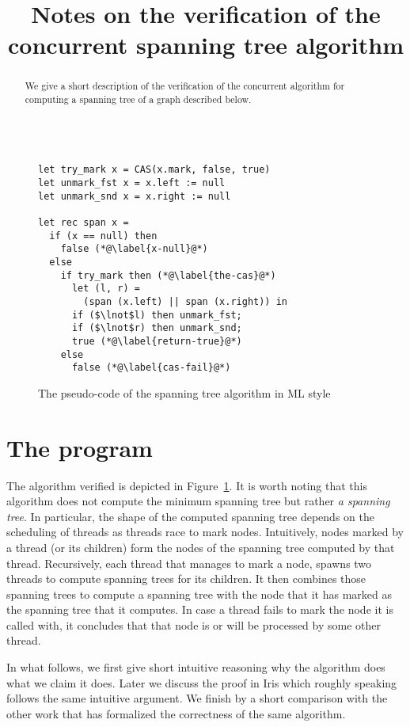 \documentclass[nocopyrightspace]{sigplanconf}
\title{Notes on the verification of the concurrent spanning tree algorithm}
\begin{document}
\maketitle

\begin{abstract}
We give a short description of the verification of the concurrent algorithm for computing
a spanning tree of a graph described below.
\end{abstract}

\begin{figure}
\begin{lstlisting}[mathescape=true, language=MyML]

let try_mark x = CAS(x.mark, false, true)
let unmark_fst x = x.left := null
let unmark_snd x = x.right := null

let rec span x =
  if (x == null) then
    false (*@\label{x-null}@*)
  else
    if try_mark then (*@\label{the-cas}@*)
      let (l, r) =
        (span (x.left) || span (x.right)) in
      if ($\lnot$l) then unmark_fst;
      if ($\lnot$r) then unmark_snd;
      true (*@\label{return-true}@*)
    else
      false (*@\label{cas-fail}@*)
\end{lstlisting}
\caption{The pseudo-code of the spanning tree algorithm in ML style}
\label{fig:code}
\end{figure}

\section{The program}
The algorithm verified is depicted in Figure~\ref{fig:code}.
It is worth noting that this algorithm does not compute the minimum
spanning tree but rather \emph{a spanning tree}.
In particular, the shape of the computed spanning tree depends on the
scheduling of threads as threads race to mark nodes.
Intuitively, nodes marked by a thread (or its children) form the nodes of
the spanning tree computed by that thread.
Recursively, each thread that manages to mark a node, spawns two
threads to compute spanning trees for its children. 
It then combines those spanning trees to compute a spanning tree with
the node that it has marked as the spanning tree that it computes.
In case a thread fails to mark the node it is called with, it concludes that
that node is or will be processed by some other thread.

In what follows, we first give short intuitive reasoning why the algorithm
does what we claim it does.
Later we discuss the proof in Iris which roughly speaking follows the
same intuitive argument.
We finish by a short comparison with the other work that has formalized
the correctness of the same algorithm.
\end{document}
